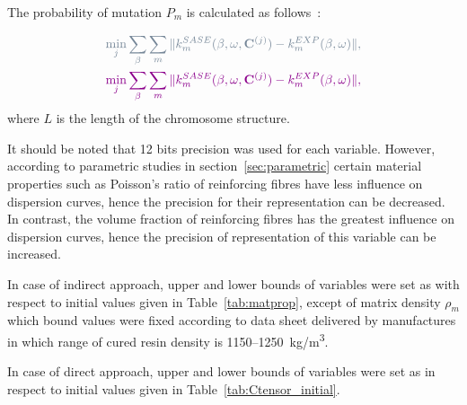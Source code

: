     The probability of mutation \(P_m\) is calculated as follows~\cite{Chipperfield1994}:

\begin{equation}
\begin{aligned}
\DIFdelmath{
	\min_j \sum_{\beta}\sum_{m} \| k^{SASE}_{m}(\beta, \omega,\matr{C}^{(j)}) 
-k^{EXP}_{m}(\beta,\omega) \|,
}\\
\DIFaddmath{
	\min_j \sum_{\beta}\sum_{m} \| k^{SASE}_{m}(\beta, \omega,\matr{C}^{(j)}) -k^{EXP}_{m}(\beta,\omega) \|,
}
\end{aligned}
\label{eq:error_fun}
\end{equation}
    where \(L\) is the length of the chromosome structure.
    
    It should be noted that 12 bits precision was used for each variable. However, according to parametric studies in section~\ref{sec:parametric} certain material properties such as Poisson's ratio of reinforcing fibres have less influence on dispersion curves, hence the precision for their representation can be decreased. In contrast, the volume fraction of reinforcing fibres has the greatest influence on dispersion curves, hence the precision of representation of this variable can be increased.
  
	In case of indirect approach, upper and lower bounds of variables were set as 
	 with respect to initial values given in Table~\ref{tab:matprop}, except of 
	matrix density \(\rho_m\) which bound values were fixed according to data sheet 
	delivered by manufactures in which range of cured resin density is 
	1150--1250~kg/m\textsuperscript{3}.  

	In case of direct approach, upper and lower bounds of variables were set as  
	 in respect to initial values given in Table~\ref{tab:Ctensor_initial}.
	
\begin{table}[h]
\caption{GA optimisation results for the indirect approach based on statistics (mean 
	\(\mu\) and standard deviation \(\sigma\)) of 15 GA runs.}
\end{table}

